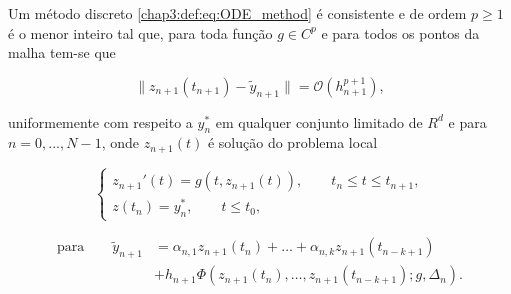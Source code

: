 \documentclass{beamer}
\theoremstyle{plain}
\theoremstyle{definition}
\begin{document}
    \begin{frame}

        \small
        \begin{definition}
            \label{chap3:def:order_of_discrete_methods}

            Um método discreto \eqref{chap3:def:eq:ODE_method}  é consistente e de ordem $p \geq 1$ é o menor inteiro tal que, para toda função $g \in C^p$ e para todos os pontos da malha tem-se que 

            \begin{equation}
                \| z_{n+1}(t_{n+1}) - \tilde{y}_{n+1} \| = \mathcal{O} (h_{n+1}^{p+1}), 
                \label{chap3:eq:order_of_discrete_methods:1}
            \end{equation}

            \noindent
            uniformemente com respeito a $y_{n}^*$ em qualquer conjunto limitado de $R^d$ e para $n = 0, ..., N-1$, onde $z_{n+1}(t)$ é solução do problema local

            \begin{equation}
                \begin{cases}
                    z_{n+1}'(t) = g(t, z_{n+1}(t)), \qquad t_n \leq t \leq t_{n+1} , \\
                    z(t_n) = y_n ^*, \qquad t \leq t_0,
                \end{cases}
                \label{chap3:eq:order_of_discrete_methods:2}
            \end{equation}


            \begin{equation}
                \begin{split}
                    \text{para} \qquad 
                    \tilde{y}_{n+1} &= \alpha_{n, 1} z_{n+1}(t_n) + \dots + \alpha_{n, k} z_{n+1}(t_{n-k+1}) \\
                                   &+ h_{n+1} \Phi(z_{n+1}(t_n), \dots, z_{n+1}(t_{n-k+1}); g, \Delta_n).
                \end{split}
                \label{chap3:eq:order_of_discrete_methods:3}
            \end{equation}

        \end{definition}

\end{frame}



\end{document}
